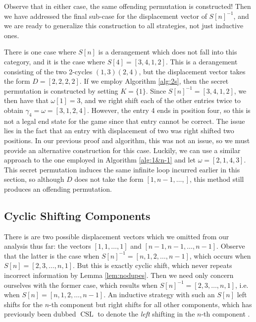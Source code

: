 \documentclass[article]{amsart}
\theoremstyle{plain}
\DeclareMathOperator{\CSL}{CSL}
\begin{document}
Observe that in either case, the same offending permutation is constructed! Then we have addressed the final sub-case for the displacement vector of $S[n]^{-1}$, and we are ready to generalize this construction to all strategies, not just inductive ones.

There is one case where $S[n]$ is a derangement which does not fall into this category, and it is the case where $S[4] = [3,4,1,2]$. This is a derangement consisting of the two 2-cycles $(1,3)(2,4)$, but the displacement vector takes the form $D = [2,2,2,2]$. If we employ Algorithm \ref{alg:2s}, then the secret permutation is constructed by setting $K = \{1\}$. Since $S[n]^{-1} = [3,4,1,2]$, we then have that $\omega[1] = 3$, and we right shift each of the other entries twice to obtain $\gamma_4 = \omega = [3,1,2,4]$. However, the entry 4 ends in position four, so this is not a legal end state for the game since that entry cannot be correct. The issue lies in the fact that an entry with displacement of two was right shifted two positions. In our previous proof and algorithm, this was not an issue, so we must provide an alternative construction for this case. Luckily, we can use a similar approach to the one employed in Algorithm \ref{alg:1&n-1} and let $\omega = [2,1,4,3]$. This secret permutation induces the same infinite loop incurred earlier in this section, so although $D$ does not take the form $[1,n-1,\dots,]$, this method still produces an offending permutation.


\subsection{Cyclic Shifting Components} \label{sub:cycshift}

There is are two possible displacement vectors which we omitted from our analysis thus far: the vectors $[1,1,\dots,1]$ and $[n-1,n-1,\dots,n-1]$. Observe that the latter is the case when $S[n]^{-1} = [n,1,2,\dots,n-1]$, which occurs when $S[n] = [2,3,\dots, n,1]$. But this is exactly cyclic shift, which never repeats incorrect information by Lemma \ref{lem:nodupes}. Then we need only concern ourselves with the former case, which results when $S[n]^{-1} = [2,3,\dots,n,1]$, i.e. when $S[n] = [n,1,2,\dots, n-1]$. An inductive strategy with such an $S[n]$ left shifts for the $n$-th component but right shifts for all other components, which has previously been dubbed $\CSL$ to denote the \textit{left} shifting in the $n$-th component \cite{hiveley2025}. 
\end{document}
